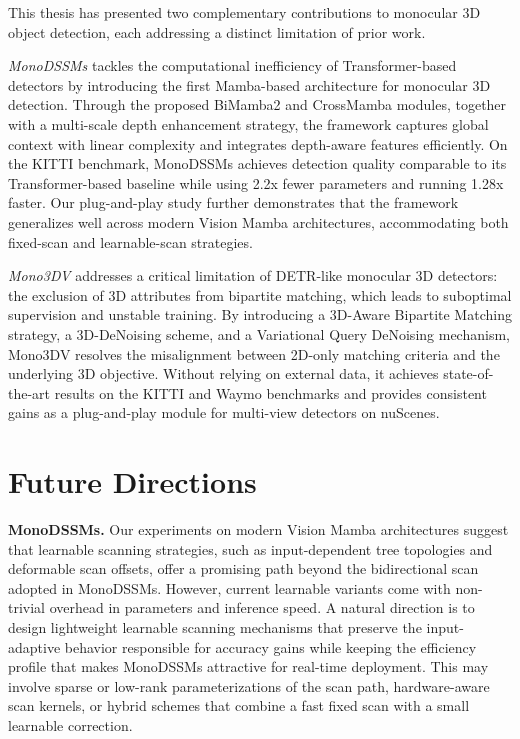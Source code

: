 This thesis has presented two complementary contributions to monocular 3D object detection, each addressing a distinct limitation of prior work.

\textit{MonoDSSMs} tackles the computational inefficiency of Transformer-based detectors by introducing the first Mamba-based architecture for monocular 3D detection. Through the proposed BiMamba2 and CrossMamba modules, together with a multi-scale depth enhancement strategy, the framework captures global context with linear complexity and integrates depth-aware features efficiently. On the KITTI benchmark, MonoDSSMs achieves detection quality comparable to its Transformer-based baseline while using 2.2x fewer parameters and running 1.28x faster. Our plug-and-play study further demonstrates that the framework generalizes well across modern Vision Mamba architectures, accommodating both fixed-scan and learnable-scan strategies.

\textit{Mono3DV} addresses a critical limitation of DETR-like monocular 3D detectors: the exclusion of 3D attributes from bipartite matching, which leads to suboptimal supervision and unstable training. By introducing a 3D-Aware Bipartite Matching strategy, a 3D-DeNoising scheme, and a Variational Query DeNoising mechanism, Mono3DV resolves the misalignment between 2D-only matching criteria and the underlying 3D objective. Without relying on external data, it achieves state-of-the-art results on the KITTI and Waymo benchmarks and provides consistent gains as a plug-and-play module for multi-view detectors on nuScenes.

\section*{Future Directions}

\textbf{MonoDSSMs.} Our experiments on modern Vision Mamba architectures suggest that learnable scanning strategies, such as input-dependent tree topologies and deformable scan offsets, offer a promising path beyond the bidirectional scan adopted in MonoDSSMs. However, current learnable variants come with non-trivial overhead in parameters and inference speed. A natural direction is to design lightweight learnable scanning mechanisms that preserve the input-adaptive behavior responsible for accuracy gains while keeping the efficiency profile that makes MonoDSSMs attractive for real-time deployment. This may involve sparse or low-rank parameterizations of the scan path, hardware-aware scan kernels, or hybrid schemes that combine a fast fixed scan with a small learnable correction.


